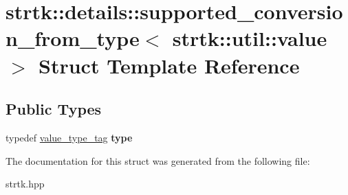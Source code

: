 \hypertarget{structstrtk_1_1details_1_1supported__conversion__from__type_3_01strtk_1_1util_1_1value_01_4}{\section{strtk\-:\-:details\-:\-:supported\-\_\-conversion\-\_\-from\-\_\-type$<$ strtk\-:\-:util\-:\-:value $>$ Struct Template Reference}
\label{structstrtk_1_1details_1_1supported__conversion__from__type_3_01strtk_1_1util_1_1value_01_4}
}
\subsection*{Public Types}
\begin{DoxyCompactItemize}
\item 
\hypertarget{structstrtk_1_1details_1_1supported__conversion__from__type_3_01strtk_1_1util_1_1value_01_4_ad96ccd3c29adddc0000c9ad61c3a494a}{typedef \hyperlink{structstrtk_1_1details_1_1value__type__tag}{value\-\_\-type\-\_\-tag} {\bfseries type}}\label{structstrtk_1_1details_1_1supported__conversion__from__type_3_01strtk_1_1util_1_1value_01_4_ad96ccd3c29adddc0000c9ad61c3a494a}

\end{DoxyCompactItemize}


The documentation for this struct was generated from the following file\-:\begin{DoxyCompactItemize}
\item 
strtk.\-hpp\end{DoxyCompactItemize}

